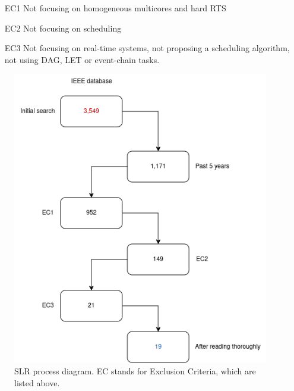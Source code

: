 \begin{itemize}{}{}
    \item [EC1] Not focusing on homogeneous multicores and hard RTS
    
    \item [EC2] Not focusing on scheduling

    \item [EC3] Not focusing on real-time systems, not proposing a scheduling algorithm, not using DAG, LET or event-chain tasks.
\end{itemize}

\begin{figure}[htbp]
    \centering
    \includegraphics[width=\linewidth]{images/slr_process.drawio.png}
    \caption{SLR process diagram. EC stands for Exclusion Criteria,
    which are listed above.}
    \label{fig:slr_process}
\end{figure}


